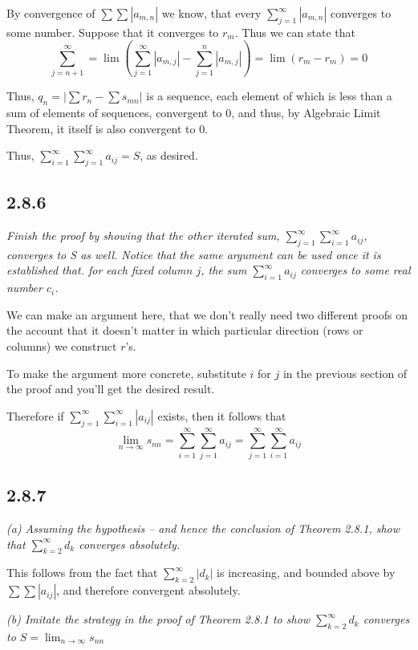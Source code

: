 \documentclass[11pt,oneside,titlepage]{book}
\begin{document}
By convergence of $\sum \sum |a_{m,n}|$ we know, that every
$\sum_{j = 1}^{\infty} |a_{m,n}|$
converges to some number. Suppose that it converges to $r_m$. 
Thus we can state that
$$\sum_{j = n + 1}^{\infty} = \lim(\sum_{j = 1}^{\infty} |a_{m,j}| - \sum_{j = 1}^{n} |a_{m,j}|) = \lim(r_m - r_m) = 0$$

Thus, $q_n = \left|\sum r_n - \sum s_{mn}\right|$ is a sequence,
each element of which is less than a sum of elements of sequences,
convergent to 0, and thus, by Algebraic Limit Theorem, it itself
is also convergent to 0.

Thus,   $\sum_{i=1}^{\infty}\sum_{j=1}^{\infty} a_{ij} = S$, as desired.

\subsection*{2.8.6}
\textit{Finish the proof by showing that the other iterated sum, $\sum_{j=1}^{\infty}\sum_{i=1}^{\infty} a_{ij}$, converges to S as well. Notice that the
  same argument can be used once it is established that. for each fixed column
  $j$, the sum $\sum_{i = 1}^{\infty} a_{ij}$ converges to some real number
  $c_i$.}

We can make an argument here, that we don't really need two different proofs
on the account that it doesn't matter in which particular direction (rows or
columns) we construct $r$'s.

To make the argument more concrete, substitute $i$ for $j$  in the
previous section of the proof and you'll get the desired result.

Therefore if $\sum_{j = 1}^{\infty}\sum_{i = 1}^{\infty}|a_{ij}|$ exists,
then it follows that 
$$\lim_{n \to \infty} s_{nn} = \sum_{i = 1}^{\infty}\sum_{j = 1}^{\infty}a_{ij} = \sum_{j = 1}^{\infty}\sum_{i = 1}^{\infty}a_{ij}$$

\subsection*{2.8.7}
\textit{(a) Assuming the hypothesis -- and hence the conclusion of
  Theorem 2.8.1, show that $\sum_{k = 2}^{\infty}d_k$ converges absolutely.}

This follows from the fact that $\sum_{k = 2}^{\infty}|d_k|$ is increasing, and bounded
above by $\sum \sum |a_{ij}|$, and therefore convergent absolutely.

\textit{(b) Imitate the strategy in the proof of Theorem 2.8.1 to show
  $\sum_{k=2}^{\infty} d_k$ converges to $S = \lim_{n \to \infty}s_{nn}$}
\end{document}
